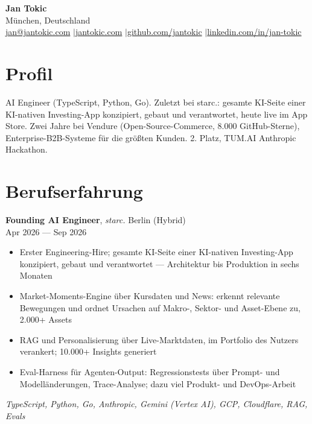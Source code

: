 \documentclass[a4paper,10pt]{article}
\newcommand{\entry}[4]{%
  \textbf{#1}, \textit{#2} \hfill #3 \\ \vspace{-2pt}
  {\small #4}%
}
\begin{document}
\begin{center}
  {\LARGE\bfseries Jan Tokic} \\[2pt]
  M\"unchen, Deutschland \\[1pt]
  \href{mailto:jan@jantokic.com}{jan@jantokic.com} \enspace$\vert$\enspace \href{https://jantokic.com}{jantokic.com} \enspace$\vert$\enspace \href{https://github.com/jantokic}{github.com/jantokic} \enspace$\vert$\enspace \href{https://linkedin.com/in/jan-tokic}{linkedin.com/in/jan-tokic}
\end{center}

\vspace{-4pt}

\section{Profil}
AI Engineer (TypeScript, Python, Go). Zuletzt bei starc.: gesamte KI-Seite einer KI-nativen Investing-App konzipiert, gebaut und verantwortet, heute live im App Store. Zwei Jahre bei Vendure (Open-Source-Commerce, 8.000 GitHub-Sterne), Enterprise-B2B-Systeme f\"ur die gr\"o\ss ten Kunden. 2. Platz, TUM.AI \texttimes{} Anthropic Hackathon.

\section{Berufserfahrung}

\entry{Founding AI Engineer}{starc.}{Berlin (Hybrid)}{Apr 2026 --- Sep 2026}
\begin{itemize}
  \item Erster Engineering-Hire; gesamte KI-Seite einer KI-nativen Investing-App konzipiert, gebaut und verantwortet --- Architektur bis Produktion in sechs Monaten
  \item Market-Moments-Engine \"uber Kursdaten und News: erkennt relevante Bewegungen und ordnet Ursachen auf Makro-, Sektor- und Asset-Ebene zu, 2.000+ Assets
  \item RAG und Personalisierung \"uber Live-Marktdaten, im Portfolio des Nutzers verankert; 10.000+ Insights generiert
  \item Eval-Harness f\"ur Agenten-Output: Regressionstests \"uber Prompt- und Modell\"anderungen, Trace-Analyse; dazu viel Produkt- und DevOps-Arbeit
\end{itemize}
{\small\textit{TypeScript, Python, Go, Anthropic, Gemini (Vertex AI), GCP, Cloudflare, RAG, Evals}}
\end{document}
